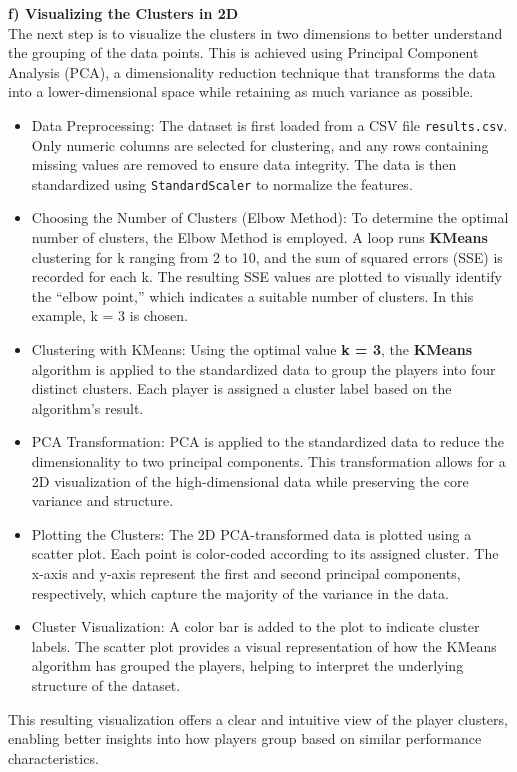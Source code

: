 \documentclass[a4paper,12pt]{article}
\begin{document}
\textbf{f) Visualizing the Clusters in 2D} \\
The next step is to visualize the clusters in two dimensions to better understand the grouping of the data points. This is achieved using Principal Component Analysis (PCA), a dimensionality reduction technique that transforms the data into a lower-dimensional space while retaining as much variance as possible.
\begin{itemize}
    \item Data Preprocessing: The dataset is first loaded from a CSV file \texttt{results.csv}. Only numeric columns are selected for clustering, and any rows containing missing values are removed to ensure data integrity. The data is then standardized using \texttt{StandardScaler} to normalize the features.
    \item Choosing the Number of Clusters (Elbow Method): To determine the optimal number of clusters, the Elbow Method is employed. A loop runs \textbf{KMeans} clustering for k ranging from 2 to 10, and the sum of squared errors (SSE) is recorded for each k. The resulting SSE values are plotted to visually identify the “elbow point,” which indicates a suitable number of clusters. In this example, k = 3 is chosen.
    \item Clustering with KMeans: Using the optimal value \textbf{k = 3}, the \textbf{KMeans} algorithm is applied to the standardized data to group the players into four distinct clusters. Each player is assigned a cluster label based on the algorithm’s result.
    \item PCA Transformation: PCA is applied to the standardized data to reduce the dimensionality to two principal components. This transformation allows for a 2D visualization of the high-dimensional data while preserving the core variance and structure.
    \item Plotting the Clusters: The 2D PCA-transformed data is plotted using a scatter plot. Each point is color-coded according to its assigned cluster. The x-axis and y-axis represent the first and second principal components, respectively, which capture the majority of the variance in the data.
    \item Cluster Visualization: A color bar is added to the plot to indicate cluster labels. The scatter plot provides a visual representation of how the KMeans algorithm has grouped the players, helping to interpret the underlying structure of the dataset.
\end{itemize}
This resulting visualization offers a clear and intuitive view of the player clusters, enabling better insights into how players group based on similar performance characteristics.
\end{document}
